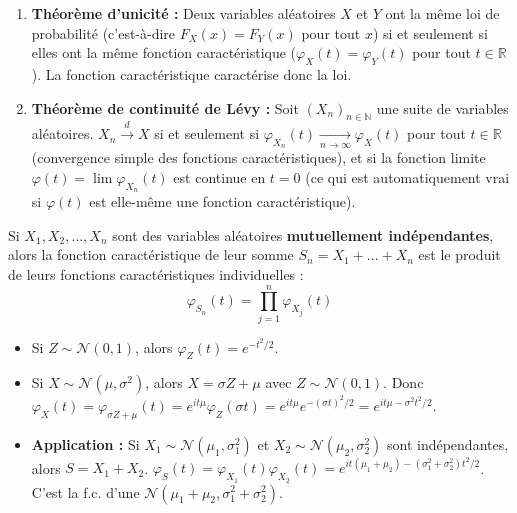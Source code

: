 \begin{proposition}
\begin{enumerate}
    \item \textbf{Théorème d'unicité :} Deux variables aléatoires $X$ et $Y$ ont la même loi de probabilité (c'est-à-dire $F_X(x) = F_Y(x)$ pour tout $x$) si et seulement si elles ont la même fonction caractéristique ($\varphi_X(t) = \varphi_Y(t)$ pour tout $t \in \mathbb{R}$). La fonction caractéristique caractérise donc la loi.
    \item \textbf{Théorème de continuité de Lévy :} Soit $(X_n)_{n \in \mathbb{N}}$ une suite de variables aléatoires. $X_n \xrightarrow{d} X$ si et seulement si $\varphi_{X_n}(t) \xrightarrow[n \to \infty]{} \varphi_X(t)$ pour tout $t \in \mathbb{R}$ (convergence simple des fonctions caractéristiques), et si la fonction limite $\varphi(t) = \lim \varphi_{X_n}(t)$ est continue en $t=0$ (ce qui est automatiquement vrai si $\varphi(t)$ est elle-même une fonction caractéristique).
\end{enumerate}
\end{proposition}

\begin{proposition}
Si $X_1, X_2, \dots, X_n$ sont des variables aléatoires \textbf{mutuellement indépendantes}, alors la fonction caractéristique de leur somme $S_n = X_1 + \dots + X_n$ est le produit de leurs fonctions caractéristiques individuelles :
$$\varphi_{S_n}(t) = \prod_{j=1}^n \varphi_{X_j}(t)$$
\end{proposition}

\begin{exemple}
\begin{itemize}
    \item Si $Z \sim \mathcal{N}(0, 1)$, alors $\varphi_Z(t) = e^{-t^2/2}$.
    \item Si $X \sim \mathcal{N}(\mu, \sigma^2)$, alors $X = \sigma Z + \mu$ avec $Z \sim \mathcal{N}(0, 1)$. Donc $\varphi_X(t) = \varphi_{\sigma Z + \mu}(t) = e^{it\mu}\varphi_Z(\sigma t) = e^{it\mu}e^{-(\sigma t)^2/2} = e^{it\mu - \sigma^2 t^2/2}$.
    \item \textbf{Application :} Si $X_1 \sim \mathcal{N}(\mu_1, \sigma_1^2)$ et $X_2 \sim \mathcal{N}(\mu_2, \sigma_2^2)$ sont indépendantes, alors $S = X_1 + X_2$. $\varphi_S(t) = \varphi_{X_1}(t)\varphi_{X_2}(t) = e^{it(\mu_1+\mu_2) - (\sigma_1^2+\sigma_2^2)t^2/2}$. C'est la f.c. d'une $\mathcal{N}(\mu_1 + \mu_2, \sigma_1^2 + \sigma_2^2)$.
\end{itemize}
\end{exemple}

